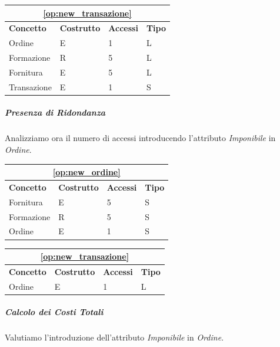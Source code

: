 					\begin{tabular}{| p{3cm} | p{3cm} | p{3cm} | p{3cm} |}
						\hline
						\multicolumn{4}{|c|}{\textbf{\ref{op:new_transazione}}} \\ \hline
						\textbf{Concetto} & \textbf{Costrutto} & \textbf{Accessi} & \textbf{Tipo} \\ \hline
						Ordine 		& E & 1 & L \\
						Formazione	& R & 5 & L \\
						Fornitura 	& E & 5 & L \\
						Transazione & E & 1 & S \\
						\hline
					\end{tabular}
					\vspace{2ex}

				\subparagraph{Presenza di Ridondanza}
					Analizziamo ora il numero di accessi introducendo l'attributo \emph{Imponibile} in \emph{Ordine}.

					\vspace{2ex}
					\begin{tabular}{| p{3cm} | p{3cm} | p{3cm} | p{3cm} |}
						\hline
						\multicolumn{4}{|c|}{\textbf{\ref{op:new_ordine}}} \\ \hline
						\textbf{Concetto} & \textbf{Costrutto} & \textbf{Accessi} & \textbf{Tipo} \\ \hline
						Fornitura 	& E & 5 & S \\
						Formazione 	& R & 5 & S \\
						Ordine 		& E & 1 & S \\
						\hline
					\end{tabular}

					\begin{tabular}{| p{3cm} | p{3cm} | p{3cm} | p{3cm} |}
						\hline
						\multicolumn{4}{|c|}{\textbf{\ref{op:new_transazione}}} \\ \hline
						\textbf{Concetto} & \textbf{Costrutto} & \textbf{Accessi} & \textbf{Tipo} \\ \hline
						Ordine 		& E & 1 & L \\
						\hline
					\end{tabular}
					\vspace{2ex}

				\subparagraph{Calcolo dei Costi Totali}
					Valutiamo l'introduzione dell'attributo \emph{Imponibile} in \emph{Ordine}.


